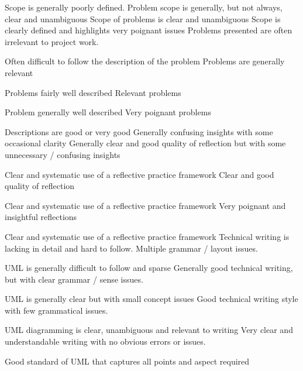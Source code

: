 \documentclass{../common/fal_assignment}
\begin{document}
\rubricmasters
\rubrichead{\ }
\begin{markingrubric}
%
        \grade\fail Scope is generally poorly defined.
        \grade Problem scope is generally, but not always, clear and unambiguous
        \grade Scope of problems is clear and unambiguous
        \grade Scope is clearly defined and highlights very poignant issues
%
        \grade \fail Problems presented are often irrelevant to project work.
            \par Often difficult to follow the description of the problem
        \grade Problems are generally relevant
            \par Problems fairly well described
        \grade Relevant problems
            \par Problem generally well described
        \grade Very poignant problems
            \par Descriptions are good or very good
%
        \grade \fail Generally confusing insights with some occasional clarity
        \grade Generally clear and good quality of reflection but with some unnecessary / confusing insights
            \par Clear and systematic use of a reflective practice framework
        \grade Clear and good quality of reflection
            \par Clear and systematic use of a reflective practice framework
        \grade Very poignant and insightful reflections
            \par Clear and systematic use of a reflective practice framework
%
        \grade \fail Technical writing is lacking in detail and hard to follow. Multiple grammar / layout issues.
            \par UML is generally difficult to follow and sparse
        \grade Generally good technical writing, but with clear grammar / sense issues.
            \par UML is generally clear but with small concept issues
        \grade Good technical writing style with few grammatical issues.
            \par UML diagramming is clear, unambiguous and relevant to writing
        \grade Very clear and understandable writing with no obvious errors or issues.
            \par Good standard of UML that captures all points and aspect required

\end{markingrubric}
\end{document}
